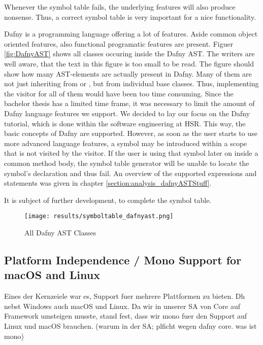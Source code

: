 Whenever the symbol table fails, the underlying features will also produce nonsense.
Thus, a correct symbol table is very important for a nice functionality.

Dafny is a programming language offering a lot of features.
Aside common object oriented features, also functional programatic features are present.
Figuer \ref{fig:DafnyAST} shows all classes occuring inside the Dafny AST.
The writers are well aware, that the text in this figure is too small to be read.
The figure should  show how many AST-elements are actually present in Dafny.
Many of them are not just inheriting from  or , but from individual base classes.
Thus, implementing the visitor for all of them would have been too time consuming.
Since the bachelor thesis has a limited time frame, it was necessary to limit the amount of Dafny language features we support.
We decided to lay our focus on the Dafny tutorial, which is done within the software engineering at HSR.
This way, the basic concepts of Dafny are supported.
However, as soon as the user starts to use more advanced language features, a symbol may be introduced within a scope that is not visited by the visitor.
If the user is using that symbol later on inside a common method body, the symbol table generator will be unable to locate the symbol's declaration and thus fail.
An overview of the supported expressions and statements was given in chapter \ref{section:analysis_dafnyASTStuff}.


It is subject of further development, to complete the symbol table.
\begin{figure}[h]
    \centering
    \texttt{[image: results/symboltable\_dafnyast.png]}
    \caption{All Dafny AST Classes}
    \label{fig:dafnyASTOverview}
\end{figure}



\subsection{Platform Independence / Mono Support for macOS and Linux}
Eines der Kernzeiele war es, Support fuer mehrere Plattformen zu bieten. Dh nebst Windows auch macOS und Linux.
Da wir in unserer SA von Core auf Framework umsteigen musste, stand fest, dass wir mono fuer den Support auf Linux und macOS brauchen.
(warum in der SA; plficht wegen dafny core. was ist mono)

